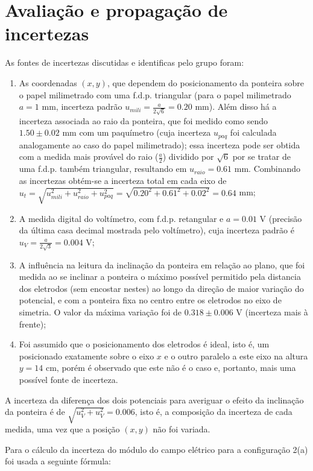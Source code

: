 \section{Avaliação e propagação de incertezas}

As fontes de incertezas discutidas e identificas pelo grupo foram:
\begin{enumerate}
    \item As coordenadas $(x,y)$, que dependem do posicionamento da ponteira sobre o papel milimetrado com uma f.d.p. triangular (para o papel milimetrado $a=1$ mm, incerteza padrão $u_{mili}=\frac{a}{2\sqrt{6}}=0.20$ mm). Além disso há a incerteza associada ao raio da ponteira, que foi medido como sendo $1.50\pm0.02$ mm com um paquímetro (cuja incerteza $u_{paq}$ foi calculada analogamente ao caso do papel milimetrado); essa incerteza pode ser obtida com a medida mais provável do raio ($\frac{a}{2}$) dividido por $\sqrt{6}$ por se tratar de uma f.d.p. também triangular, resultando em $u_{raio}=0.61$ mm. Combinando as incertezas obtém-se a incerteza total em cada eixo de $u_t=\sqrt{u_{mili}^2+u_{raio}^2+u_{paq}^2}=\sqrt{0.20^2+0.61^2+0.02^2}=0.64$ mm;
    \item A medida digital do voltímetro, com f.d.p. retangular e $a=0.01$ V (precisão da última casa decimal mostrada pelo voltímetro), cuja incerteza padrão é $u_V=\frac{a}{2\sqrt{3}}=0.004$ V;
    \item A influência na leitura da inclinação da ponteira em relação ao plano, que foi medida ao se inclinar a ponteira o máximo possível permitido pela distancia dos eletrodos (sem encostar nestes) ao longo da direção de maior variação do potencial, e com a ponteira fixa no centro entre os eletrodos no eixo de simetria. O valor da máxima variação foi de $0.318\pm0.006$ V (incerteza mais à frente);
    \item Foi assumido que o posicionamento dos eletrodos é ideal, isto é, um posicionado exatamente sobre o eixo $x$ e o outro paralelo a este eixo na altura $y=14$ cm, porém é observado que este não é o caso e, portanto, mais uma possível fonte de incerteza.
\end{enumerate}

A incerteza da diferença dos dois potenciais para averiguar o efeito da inclinação da ponteira é de $\sqrt{u_{V}^2+u_V^2}=0.006$, isto é, a composição da incerteza de cada medida, uma vez que a posição $(x,y)$ não foi variada.

Para o cálculo da incerteza do módulo do campo elétrico para a configuração 2(a) foi usada a seguinte fórmula:

